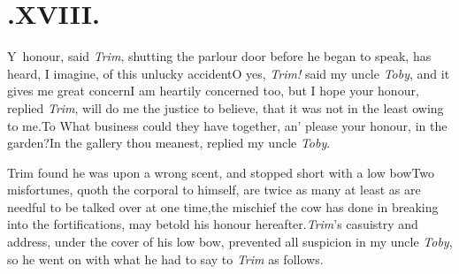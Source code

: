 \documentclass{article}
\begin{document}
\medskip
\section{.\enspace XVIII.}

\lettrine{Y}{\,} honour, said \textit{Trim}, shutting\break
the parlour door before he began\break
to speak, has heard, I imagine, of this\pb
unlucky accident\tsh O yes,
\textit{Trim!} said my uncle \textit{Toby}, and it gives me
great\break
concern\tsk I am heartily concerned too, but I hope your honour,
replied \textit{Trim},\break
will do me the justice to believe, that it was
not in the least owing to me.\tsh To
What business could they have together, an’ please your honour, in
the garden?\tsh In the gallery thou meanest, replied my
uncle \textit{Toby}.

Trim found he was upon a wrong scent, and stopped short with a
low bow\break\tsh Two misfortunes, quoth the corporal to
himself, are twice as many at least as are needful to be talked
over at one time,\break\tsh the mischief the cow has done in
breaking into the fortifications, may be\pb told his honour
hereafter.\tsk \textit{Trim}’s casuistry and address,
under the cover of his low bow, prevented all suspicion in my uncle
\textit{Toby}, so he went on with what he had to say to \textit{Trim}
as follows.
\end{document}
